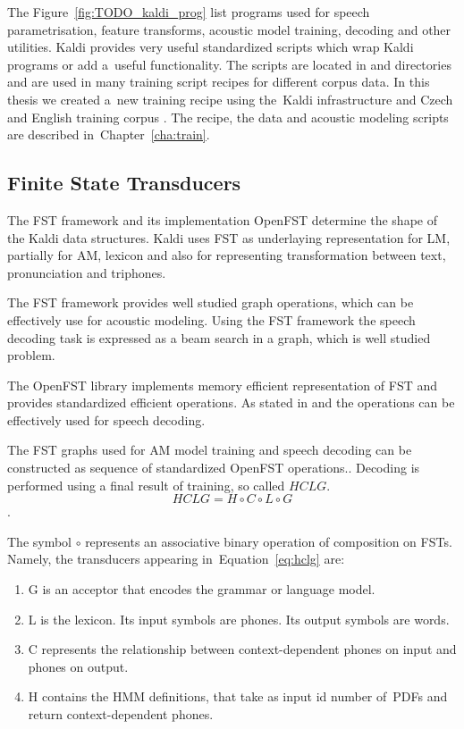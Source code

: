 {
The Figure~\ref{fig:TODO_kaldi_prog} list programs used 
for speech parametrisation, feature transforms, acoustic model
training, decoding and other utilities. Kaldi provides very useful standardized scripts which wrap
Kaldi programs or add a~useful functionality. The scripts are located in  and 
directories and are used in many training script recipes for different corpus data.
In this thesis we created a~new training recipe using the~Kaldi infrastructure and
Czech and English training corpus \cite{korvas_2014}.
The recipe, the data and acoustic modeling scripts are described in~Chapter~\ref{cha:train}.

\subsection{Finite State Transducers} 
\label{sec:fst}
The \acl{FST} framework and its implementation OpenFST  
determine the shape of the Kaldi data structures.
Kaldi uses \ac{FST} as underlaying representation for \ac{LM}, partially for \ac{AM}, lexicon and 
also for representing transformation between text, pronunciation and triphones.

The \ac{FST} framework provides well studied graph operations\cite{mohri2002weighted},
which can be effectively use for acoustic modeling.
Using the \ac{FST} framework the speech decoding task is expressed as
a beam search in a graph, which is well studied problem.

The OpenFST library implements memory efficient representation of \ac{FST} and
provides standardized efficient operations.
As stated in \cite{mohri2002weighted} and \cite{povey2011kaldi} the operations can be effectively used
for speech decoding. 

The \ac{FST} graphs used for \ac{AM} model training and speech decoding
can be constructed as sequence of standardized OpenFST operations.\cite{mohri2002weighted}.
Decoding is performed using a final result of training, so called  $HCLG$. 
\begin{equation} \label{eq:hclg}
HCLG = H\circ C\circ L\circ G
\end{equation}.

The symbol $\circ$ represents an associative binary operation of composition on \acp{FST}.
Namely, the transducers appearing in~Equation~\ref{eq:hclg} are:
\begin{enumerate}
    \item G is an acceptor that encodes the grammar or language model.
    \item L is the lexicon. Its input symbols are phones. Its output symbols are words.
    \item C represents the relationship between context-dependent phones on input and phones on output.
    \item H contains the \ac{HMM} definitions, that take as input id number of~\acp{PDF} and return context-dependent phones.
\end{enumerate}

}
